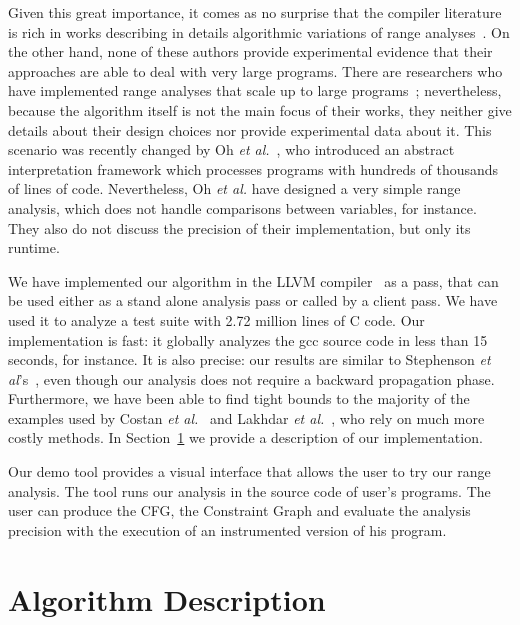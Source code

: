 \documentclass{paper}
\begin{document}
Given this great importance, it comes as no surprise that the compiler
literature is rich in works describing in details algorithmic variations of
range analyses~\cite{Gawlitza09,Mahlke01,Stephenson00,Su05}.
On the other hand, none of these authors provide experimental evidence that
their approaches are able to deal with very large programs.
There are researchers who have implemented range analyses that scale up to
large programs~\cite{Blanchet03,Venet04}; nevertheless, because the
algorithm itself is not the main focus of their works, they neither give
details about their design choices nor provide experimental data about it.
This scenario was recently changed by Oh {\em et al.}~\cite{Oh12}, who
introduced an abstract interpretation framework which processes programs with
hundreds of thousands of lines of code.
Nevertheless, Oh {\em et al.} have designed a very simple range analysis,
which does not handle comparisons between variables, for instance.
They also do not discuss the precision of their implementation, but only its
runtime.

We have implemented our algorithm in the LLVM compiler~\cite{Lattner04} as a pass, 
that can be used either as a stand alone analysis pass or called by a client pass. 
We have used it to analyze a test suite with 2.72 million lines of C code.
Our implementation is fast: it globally analyzes the gcc source code in less than
15 seconds, for instance. 
It is also precise: our results are similar to Stephenson
{\em et al}'s~\cite{Stephenson00}, even though our analysis does not require
a backward propagation phase.
Furthermore, we have been able to find tight bounds to the majority of the
examples used by Costan {\em et al.}~\cite{Costan05} and Lakhdar
{\em et al.}~\cite{Lakhdar11}, who rely on much more costly methods.
In Section~\ref{sec:dsc} we provide a description of our implementation.

Our demo tool provides a visual interface that allows the user to try our
range analysis. The tool runs our analysis in the source
code of user's programs. The user can produce the CFG, the Constraint Graph
and evaluate the analysis precision with the execution of an instrumented
version of his program.


\section{Algorithm Description}
\label{sec:dsc}
\end{document}

